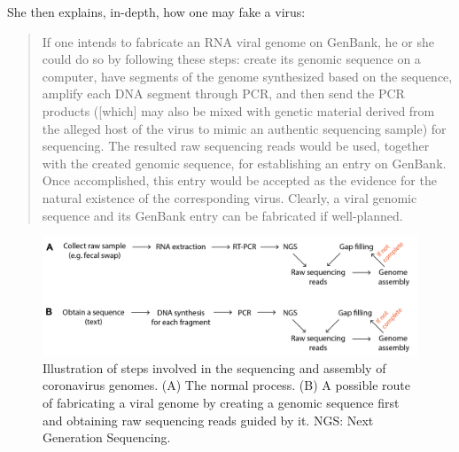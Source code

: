\documentclass[11pt]{article}
\begin{document}
She then explains, in-depth, how one may fake a virus:
\begin{quote}
If one intends to fabricate an RNA viral genome on GenBank, he or she could do so by following these steps: create its genomic sequence on a computer, have segments of the genome synthesized based on the sequence, amplify each DNA segment through PCR, and then send the PCR products ([which] may also be mixed with genetic material derived from the alleged host of the virus to mimic an authentic sequencing sample) for sequencing. The resulted raw sequencing reads would be used, together with the created genomic sequence, for establishing an entry on GenBank. Once accomplished, this entry would be accepted as the evidence for the natural existence of the corresponding virus. Clearly, a viral genomic sequence and its GenBank entry can be fabricated if well-planned.
\end{quote}
\begin{figure}[htbp]
\centering
\includegraphics[width=.9\linewidth]{./images/how-to-fake-a-virus.png}
\caption{Illustration of steps involved in the sequencing and assembly of coronavirus genomes. (A) The normal process. (B) A possible route of fabricating a viral genome by creating a genomic sequence first and obtaining raw sequencing reads guided by it. NGS: Next Generation Sequencing.}
\end{figure}
\end{document}
